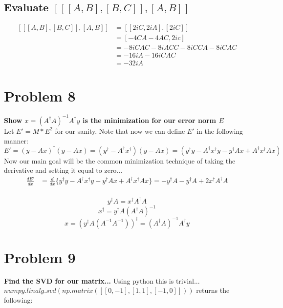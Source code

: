 \documentclass[10pt,a4paper]{article}
\begin{document}
	
	\subsection{Evaluate $[[[A,B],[B,C]],[A,B]]$}
	\begin{equation}
		\nonumber
		\begin{split}
			[[[A,B],[B,C]],[A,B]] &= [[2iC,2iA],[2iC]]\\
			&= [-4CA-4AC,2ic]\\
			&= -8iCAC-8iACC-8iCCA-8iCAC\\
			&= -16iA-16iCAC\\
			&= -32iA
		\end{split}
	\end{equation}
	
	\section{Problem 8}
	\textbf{Show $x=(A^\dagger A)^{-1}A^\dagger y$ is the  minimization for our error norm $E$}\\
	Let $E'=M*E^2$ for our sanity. Note that now we can define $E'$ in the following manner:
	$$E' = (y-Ax)^\dagger(y-Ax) = (y^\dagger -A^\dagger x^\dagger)(y-Ax) = (y^\dagger y - A^\dagger x^\dagger y - y^\dagger Ax + A^\dagger x^\dagger Ax) $$
	Now our main goal will be the common minimization technique of taking the derivative and setting it equal to zero...
	\begin{equation}
	\nonumber
	\begin{split}
		\frac{dE'}{dx} &= \frac{d}{dx}\Big\{  y^\dagger y - A^\dagger x^\dagger y - y^\dagger Ax + A^\dagger x^\dagger Ax \Big\}
		= -y^\dagger A - y^\dagger A+2x^\dagger A^\dagger A\\
	\end{split}
	\end{equation}
	
	$$y^\dagger A = x^\dagger A^\dagger A $$
	$$x^\dagger = y^\dagger A(A^\dagger A)^{-1} $$
	$$x = (y^\dagger A(A^{-1}A^{-1}))^\dagger = (A^\dagger A)^{-1}A^\dagger y  $$
	
	
	
	\section{Problem 9}
	\textbf{Find the SVD for our matrix...}
	Using python this is trivial...\\
	$numpy.linalg.svd(np.matrix([[0,-1],[1,1],[-1,0]]))$ returns the following:
	
\end{document}
